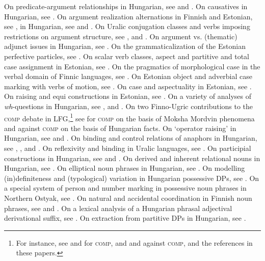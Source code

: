 \documentclass[output=paper,hidelinks]{langscibook}
\begin{document}
On predicate-argument relationships in Hungarian, see \citet{Komlosy1992,Komlosy1994} and \citet{Rakosi2008}. On causatives in Hungarian, see \citet{Komlosy2000}. On argument realization alternations in Finnish and Estonian, see \citet{AckermanMoore1999}, in Hungarian, see \citet{Ackerman1992} and \citet{Laczko2013b}. On Uralic conjugation classes and verbs imposing restrictions on argument structure, see \citet{Abondolo1998}, \citet{Nikolaeva2014} and \citet{TammVolkovatoappear}. On argument vs. (thematic) adjunct issues in Hungarian, see \citet{Rakosi2003,Rakosi2006,Rakosi2006a,Rakosi2012}. On the grammaticalization of the Estonian perfective particles, see \citet{Tamm2004b}. On scalar verb classes, aspect and partitive and total case assignment in Estonian, see \citet{Tamm2012c}. On the pragmatics of morphological case in the verbal domain of Finnic languages, see \citet{Tamm2011a}. On Estonian object and adverbial case marking with verbs of motion, see \citet{Tamm2007c}. On case and aspectuality in Estonian, see \citet{Tamm2008,Tamm2012b}. On raising and equi constructions in Estonian, see \citet{Tamm2004a,Tamm2008}. On a variety of analyses of \textit{wh}{}-questions in Hungarian, see \citet{Mycock2004,Mycock2006,Mycock2010,Mycock2013}, \citet{Gazdik2010} and \citet{Laczko14,Laczko2021}. On two Finno-Ugric contributions to the \textsc{comp} debate in LFG,\footnote{For instance, see \citet{DL00} and \citet{Lodrup2012} for \textsc{comp}, and \citet{AMM05} and \citet{patejuk2016reducing} against \textsc{comp}, and the references in these papers.} see \citet{BelyaevKozhemyakinaSerdobolskaya2017} for \textsc{comp} on the basis of Moksha Mordvin phenomena and \citet{Szucs2018} against \textsc{comp} on the basis of Hungarian facts. On `operator raising' in Hungarian, see \citet{Coppock2003} and \citet{Szucs2013,Szucs2014a,Szucs2018a}. On binding and control relations of anaphors in Hungarian, see \citet{Rakosi2009,Rakosi2010}, \citet{LaczkoRakosi2019}, \citet{Szucs2019b} and \citet{LaczkoRakosiSzucs2020}. On reflexivity and binding in Uralic languages, see \citet{Volkova2014,Volkovatoappear}. On participial constructions in Hungarian, see \citet{Komlosy1992,Komlosy1994} and \citet{Laczko95,Laczko2000b,Laczko2005}. On derived and inherent relational nouns in Hungarian, see \citet{Laczko2008b,Laczko2009a}. On elliptical noun phrases in Hungarian, see \citet{Laczko2007}. On modelling (in)definiteness and (typological) variation in Hungarian possessive DPs, see \citet{Laczko17}. On a special system of person and number marking in possessive noun phrases in Northern Ostyak, see \citet{AckermanNikolaeva1997}. On natural and accidental coordination in Finnish noun phrases, see \citet{kingdalrymple04} and \citet{DalrympleNikolaeva2006}. On a lexical analysis of a Hungarian phrasal adjectival derivational suffix, see \citet{Laczko1997}. On extraction from partitive DPs in Hungarian, see \citet{Chisarik2002}.
\end{document}
